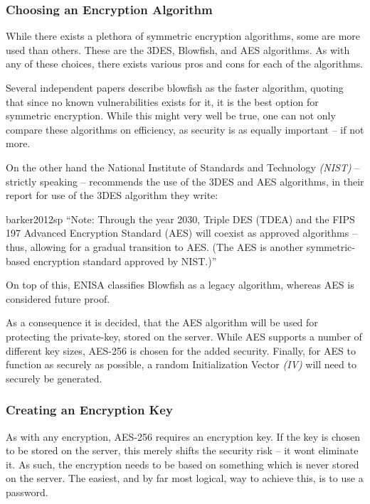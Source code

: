 			\subsubsection{Choosing an Encryption Algorithm}
				While there exists a plethora of symmetric encryption algorithms, some are more used than others. These are the 3DES, Blowfish, and AES algorithms. As with any of these choices, there exists various pros and cons for each of the algorithms. 

				Several independent papers describe blowfish as the faster algorithm, quoting that since no known vulnerabilities exists for it, it is the best option for symmetric encryption\cite{thakur2011aes,singh2011comparison,verma2011peformance,ramesh2013performance}. While this might very well be true, one can not only compare these algorithms on efficiency, as security is as equally important -- if not more. 

				On the other hand the National Institute of Standards and Technology \emph{(NIST)} -- strictly speaking -- recommends the use of the 3DES and AES algorithms\cite{barker2012sp}, in their report for use of the 3DES algorithm they write:
				\begin{citequote}{barker2012sp}
					``Note: Through the year 2030, Triple DES (TDEA) and the FIPS 197 Advanced Encryption Standard (AES) will coexist as approved algorithms – thus, allowing for a gradual transition to AES. (The AES is another symmetric-based encryption standard approved by NIST.)''
				\end{citequote}

				On top of this, ENISA classifies Blowfish as a legacy algorithm, whereas AES is considered future proof\cite[p.20]{enisa}.

				As a consequence it is decided, that the AES algorithm will be used for protecting the private-key, stored on the server. While AES supports a number of different key sizes, AES-256 is chosen for the added security. Finally, for AES to function as securely as possible, a random Initialization Vector \emph{(IV)} will need to securely be generated.

			\subsubsection{Creating an Encryption Key}
				\label{sec:kdf}
				As with any encryption, AES-256 requires an encryption key. If the key is chosen to be stored on the server, this merely shifts the security risk -- it wont eliminate it. As such, the encryption needs to be based on something which is never stored on the server. The easiest, and by far most logical, way to achieve this, is to use a password. 


